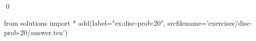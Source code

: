 
\begin{ex} 
  \label{ex:disc-prob-20}
  
  \qed
\end{ex} 
\begin{python0}
from solutions import *
add(label="ex:disc-prob-20",
    srcfilename='exercises/disc-prob-20/answer.tex') 
\end{python0}
